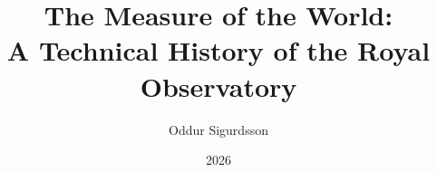 %
%
%

\title{The Measure of the World:\\A Technical History of the Royal Observatory}

\author{Oddur Sigurdsson}

\newcommand{\editionname}{First Edition}
\newcommand{\editiondate}{2026}
\date{\editiondate}

\newcommand{\isbnprint}{not yet assigned}
\newcommand{\isbnebook}{not yet assigned}

\newcommand{\bodyfontsize}{11pt}

\newcommand{\bookdescription}{%
How astronomers, clockmakers, and mathematicians built the infrastructure of precision---one arc-second at a time.%
}
